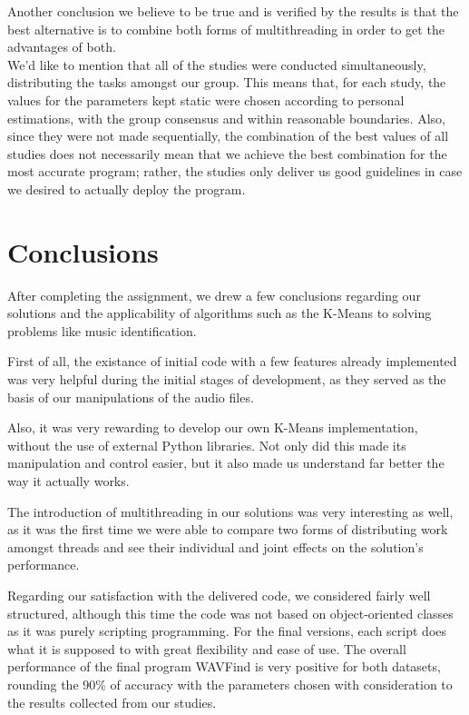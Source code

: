 \documentclass[12pt]{article}
\begin{document}
Another conclusion we believe to be true and is verified by the results is that
the best alternative is to combine both forms of multithreading in order to get
the advantages of both. \\

We'd like to mention that all of the studies were conducted simultaneously,
distributing the tasks amongst our group.
This means that, for each study, the values for the parameters kept static were
chosen according to personal estimations, with the group consensus and within
reasonable boundaries.
Also, since they were not made sequentially, the combination of the best values
of all studies does not necessarily mean that we achieve the best combination for
the most accurate program; rather, the studies only deliver us good guidelines
in case we desired to actually deploy the program.

\newpage
\section*{Conclusions}

After completing the assignment, we drew a few conclusions regarding our 
solutions and the applicability of algorithms such as the K-Means to solving
problems like music identification.

First of all, the existance of initial code with a few features already 
implemented was very helpful during the initial stages of development, as they 
served as the basis of our manipulations of the audio files.

Also, it was very rewarding to develop our own K-Means implementation, without 
the use of external Python libraries. 
Not only did this made its manipulation and control easier, but it also made us 
understand far better the way it actually works.

The introduction of multithreading in our solutions was very interesting as well,
as it was the first time we were able to compare two forms of distributing work
amongst threads and see their individual and joint effects on the solution's 
performance.

Regarding our satisfaction with the delivered code, we considered fairly well 
structured, although this time the code was not based on object-oriented classes
as it was purely scripting programming.
For the final versions, each script does what it is supposed to with great 
flexibility and ease of use.
The overall performance of the final program WAVFind is very positive for both
datasets, rounding the 90\% of accuracy with the parameters chosen with 
consideration to the results collected from our studies.
\end{document}
